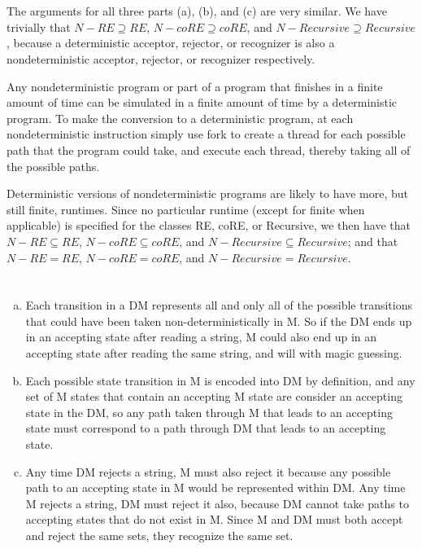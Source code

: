 \documentclass{article}
\begin{document}
\section{}
The arguments for all three parts (a), (b), and (c) are very similar. We have
trivially that $N-RE \supseteq RE $, $N-coRE \supseteq coRE$, and $N-Recursive
\supseteq Recursive$, because a deterministic acceptor, rejector, or
recognizer is also a nondeterministic acceptor, rejector, or recognizer
respectively.

Any nondeterministic program or part of a program that finishes in a finite
amount of time can be simulated in a finite amount of time by a deterministic
program. To make the conversion to a deterministic program, at each
nondeterministic instruction simply use fork to create a thread for each
possible path that the program could take, and execute each thread, thereby
taking all of the possible paths.

Deterministic versions of nondeterministic programs are likely to have more, but
still finite, runtimes. Since no particular runtime (except for finite when
applicable) is specified for the classes RE, coRE, or Recursive, we then have
that $N-RE \subseteq RE $, $N-coRE \subseteq coRE$, and $N-Recursive \subseteq
Recursive$; and that $N-RE = RE $, $N-coRE = coRE$, and
$N-Recursive = Recursive$.

\section{}
\begin{enumerate}[(a)]
\item
Each transition in a DM represents all and only all of the possible transitions
that could
have been taken non-deterministically in M. So if the DM ends up in an accepting
state after reading a string, M could also end up in an accepting state after
reading the same string, and will with magic guessing.

\item
Each possible state transition in M is encoded into DM by definition, and any
set of M states that contain an accepting M state are consider an accepting
state in the DM, so any path taken through M that leads to an accepting state
must correspond to a path through DM that leads to an accepting state.

\item
Any time DM rejects a string, M must also reject it because any possible path to
an accepting state in M would be represented within DM. Any time M rejects a
string, DM must reject it also, because DM cannot take paths to accepting states
that do not exist in M. Since M and DM must both accept and reject the same
sets, they recognize the same set.
\end{enumerate}
\end{document}
